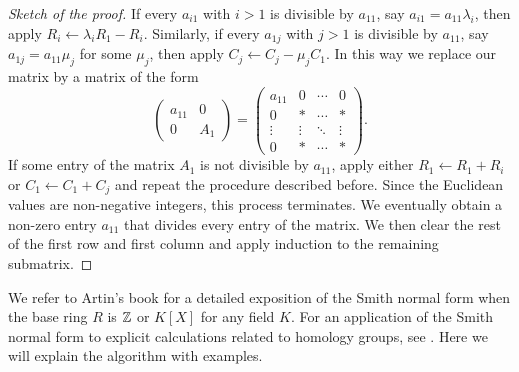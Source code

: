 \begin{proof}[Sketch of the proof]
If every $a_{i1}$ with $i>1$ is divisible by $a_{11}$, say $a_{i1}=a_{11}\lambda_i$, then
apply $R_i\leftarrow \lambda_i R_1-R_i$. Similarly, if 
every $a_{1j}$ with $j>1$ is divisible by $a_{11}$, say 
$a_{1j}=a_{11}\mu_j$ for some $\mu_j$, then
apply $C_j\leftarrow C_j-\mu_j C_1$. In this way we replace our matrix by 
a matrix of the form 
\[
\begin{pmatrix}
	a_{11} & 0\\
	0 & A_1
\end{pmatrix}
=\begin{pmatrix}
	a_{11} & 0 & \cdots & 0\\
	0 & * & \cdots & *\\
	\vdots & \vdots & \ddots & \vdots \\
	0 & * & \cdots & *
\end{pmatrix}.
\]
If some entry of the matrix $A_1$ is not divisible by $a_{11}$, apply either 
$R_1\leftarrow R_1+R_i$ or $C_1\leftarrow C_1+C_j$ and repeat 
the procedure described before. 
Since the Euclidean values are non-negative integers, this process
terminates. We eventually obtain a non-zero entry $a_{11}$ that
divides every entry of the matrix. We then clear the rest of the
first row and first column and apply induction to the remaining
submatrix.
\end{proof}

We refer to Artin's book \cite[\S14]{MR1129886} for 
a detailed exposition of the Smith normal form 
when the base ring $R$ is $\mathbb{Z}$ or
$K[X]$ for any field $K$. For an application 
of the Smith normal form to explicit calculations related to 
homology groups, see \cite[\S11]{MR755006}. 
Here we will explain the algorithm with examples. 


